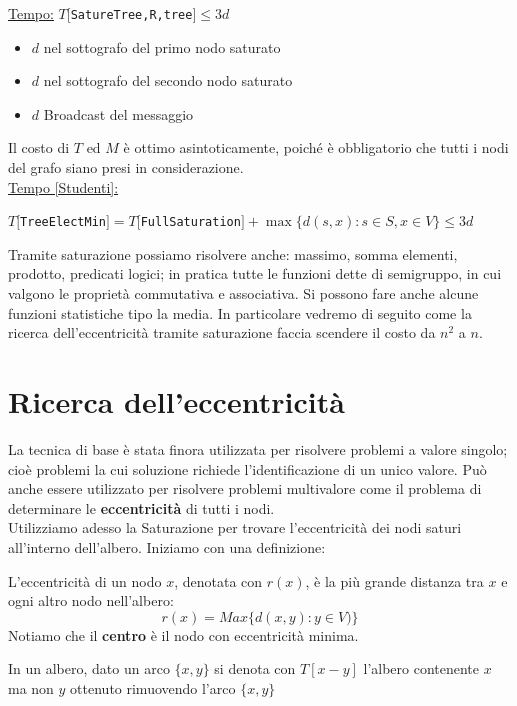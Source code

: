 \underline{Tempo:}
$T[$\texttt{SatureTree,R,tree}$] \leq 3d$
\begin{itemize}
    \item $d$ nel sottografo del primo nodo saturato
    \item $d$ nel sottografo del secondo nodo saturato
    \item $d$ Broadcast del messaggio
\end{itemize}


Il costo di $T$ ed $M$ è ottimo asintoticamente, poiché è obbligatorio che tutti i
nodi del grafo siano presi in considerazione.\\
\underline{Tempo [Studenti]:}
\begin{center}
    $T[$\texttt{TreeElectMin}$] = T[$\texttt{FullSaturation}$] + \max \{ d(s, x) :
        s \in S, x \in V \} \leq 3d$
\end{center}

Tramite saturazione possiamo risolvere anche: massimo, somma elementi, prodotto,
predicati logici; in pratica tutte le funzioni dette di semigruppo, in cui
valgono le proprietà commutativa e associativa. Si possono fare anche alcune
funzioni statistiche tipo la media. In particolare vedremo di seguito come la
ricerca dell'eccentricità tramite saturazione faccia scendere il costo da $n^2$
a $n$.

\section{Ricerca dell'eccentricità}
La tecnica di base è stata finora utilizzata per risolvere problemi a valore
singolo; cioè problemi la cui soluzione richiede l'identificazione di un unico
valore. Può anche essere utilizzato per risolvere problemi multivalore come il
problema di determinare le \textbf{eccentricità} di tutti i nodi.\\
Utilizziamo adesso la Saturazione per trovare l'eccentricità dei nodi saturi
all'interno dell'albero. Iniziamo con una definizione:\\

\begin{definition}
    L'eccentricità di un nodo $x$, denotata con $r(x)$, è la più grande
    distanza tra $x$ e ogni altro nodo nell'albero: $$r(x) = Max\{d(x,y) : y \in
        V)\}$$ Notiamo che il \textbf{centro} è il nodo con eccentricità minima.
\end{definition}

\begin{definition}
    In un albero, dato un arco $\{x,y\}$ si denota con $T[x - y]$
    l'albero contenente $x$ ma non $y$ ottenuto rimuovendo l'arco $\{x,y\}$
\end{definition}

